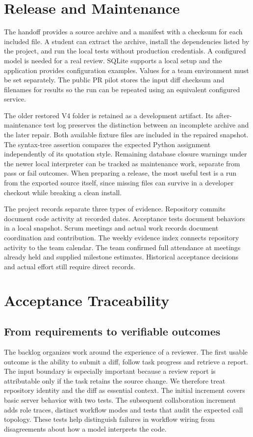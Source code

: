 \documentclass[journal,compsoc]{IEEEtran}
\begin{document}
\section{Release and Maintenance}
The handoff provides a source archive and a manifest with a checksum for each included file. A student can extract the archive, install the dependencies listed by the project, and run the local tests without production credentials. A configured model is needed for a real review. SQLite supports a local setup and the application provides configuration examples. Values for a team environment must be set separately. The public PR pilot stores the input diff checksum and filenames for results so the run can be repeated using an equivalent configured service.

The older restored V4 folder is retained as a development artifact. Its after-maintenance test log preserves the distinction between an incomplete archive and the later repair. Both available fixture files are included in the repaired snapshot. The syntax-tree assertion compares the expected Python assignment independently of its quotation style. Remaining database closure warnings under the newer local interpreter can be tracked as maintenance work, separate from pass or fail outcomes. When preparing a release, the most useful test is a run from the exported source itself, since missing files can survive in a developer checkout while breaking a clean install.

The project records separate three types of evidence. Repository commits document code activity at recorded dates. Acceptance tests document behaviors in a local snapshot. Scrum meetings and actual work records document coordination and contribution. The weekly evidence index connects repository activity to the team calendar. The team confirmed full attendance at meetings already held and supplied milestone estimates. Historical acceptance decisions and actual effort still require direct records.


\section{Acceptance Traceability}
\subsection{From requirements to verifiable outcomes}
The backlog organizes work around the experience of a reviewer. The first usable outcome is the ability to submit a diff, follow task progress and retrieve a report. The input boundary is especially important because a review report is attributable only if the task retains the source change. We therefore treat repository identity and the diff as essential context. The initial increment covers basic server behavior with two tests. The subsequent collaboration increment adds role traces, distinct workflow modes and tests that audit the expected call topology. These tests help distinguish failures in workflow wiring from disagreements about how a model interprets the code.
\end{document}
